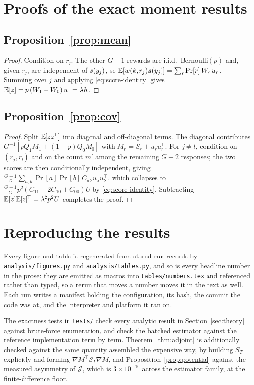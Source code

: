 \section{Proofs of the exact moment results}
\label{app:proofs}

\subsection*{Proposition~\ref{prop:mean}}
\begin{proof}
  Condition on $r_j$. The other $G-1$ rewards are i.i.d.\ Bernoulli$(p)$ and, given $r_j$, are
  independent of $\bm{s}(y_j)$, so
  $\mathbb{E}[w(k, r_j)\bm{s}(y_j)] = \sum_{r} \Pr[r]\, W_r\, u_r$. Summing over $j$ and applying
  \eqref{eq:score-identity} gives $\mathbb{E}[z] = p\,(W_1 - W_0)\,u_1 = \lambda h$.
\end{proof}

\subsection*{Proposition~\ref{prop:cov}}
\begin{proof}
  Split $\mathbb{E}[z z^{\!\top}]$ into diagonal and off-diagonal terms. The diagonal contributes
  $G^{-1}[p Q_1 M_1 + (1-p) Q_0 M_0]$ with $M_r = S_r + u_r u_r^{\!\top}$. For $j \neq l$,
  condition on $(r_j, r_l)$ and on the count $m'$ among the remaining $G-2$ responses; the two
  scores are then conditionally independent, giving
  $\frac{G-1}{G}\sum_{a,b}\Pr[a]\Pr[b]\,C_{ab}\,u_a u_b^{\!\top}$, which collapses to
  $\frac{G-1}{G} p^2 (C_{11} - 2C_{10} + C_{00}) U$ by \eqref{eq:score-identity}. Subtracting
  $\mathbb{E}[z]\mathbb{E}[z]^{\!\top} = \lambda^2 p^2 U$ completes the proof.
\end{proof}

\section{Reproducing the results}
\label{app:repro}

Every figure and table is regenerated from stored run records by
\texttt{analysis/figures.py} and \texttt{analysis/tables.py}, and so is every headline number in
the prose: they are emitted as macros into \texttt{tables/numbers.tex} and referenced rather than
typed, so a rerun that moves a number moves it in the text as well. Each run writes a manifest holding the configuration, its hash, the commit the
code was at, and the interpreter and platform it ran on.

The exactness tests in \texttt{tests/} check every analytic result in Section~\ref{sec:theory}
against brute-force enumeration, and check the batched estimator against the reference
implementation term by term. Theorem~\ref{thm:adjoint} is additionally checked against the same
quantity assembled the expensive way, by building $S_T$ explicitly and forming
$\nabla M^{\!\top} S_T \nabla M$, and Proposition~\ref{prop:potential} against the measured
asymmetry of $\mathcal{J}$, which is $3\times10^{-10}$ across the estimator family, at the finite-difference
floor.

